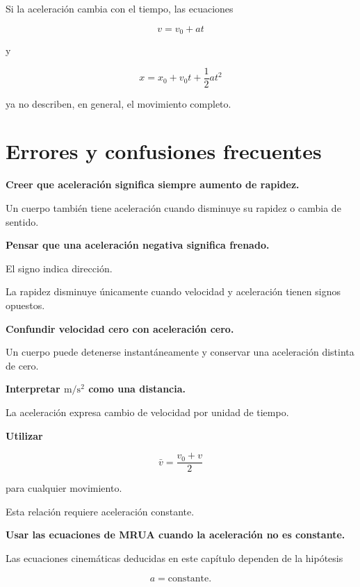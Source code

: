 Si la aceleración cambia con el tiempo, las ecuaciones

\[ v=v_0+at \]

y

\[ x=x_0+v_0t+\frac{1}{2}at^2 \]

ya no describen, en general, el movimiento completo.


\section{Errores y confusiones frecuentes}

\begin{errorfrecuente}
\textbf{Creer que aceleración significa siempre aumento de rapidez.}

Un cuerpo también tiene aceleración cuando disminuye su rapidez o cambia de
sentido.
\end{errorfrecuente}


\begin{errorfrecuente}
\textbf{Pensar que una aceleración negativa significa frenado.}

El signo indica dirección.

La rapidez disminuye únicamente cuando velocidad y aceleración tienen signos
opuestos.
\end{errorfrecuente}


\begin{errorfrecuente}
\textbf{Confundir velocidad cero con aceleración cero.}

Un cuerpo puede detenerse instantáneamente y conservar una aceleración
distinta de cero.
\end{errorfrecuente}


\begin{errorfrecuente}
\textbf{Interpretar \(\si{\meter\per\second\squared}\) como una distancia.}

La aceleración expresa cambio de velocidad por unidad de tiempo.
\end{errorfrecuente}


\begin{errorfrecuente}
\textbf{Utilizar}

\[ \bar{v}=\frac{v_0+v}{2} \]

para cualquier movimiento.

Esta relación requiere aceleración constante.
\end{errorfrecuente}


\begin{errorfrecuente}
\textbf{Usar las ecuaciones de MRUA cuando la aceleración no es constante.}

Las ecuaciones cinemáticas deducidas en este capítulo dependen de la
hipótesis

\[ a=\text{constante}. \]
\end{errorfrecuente}


